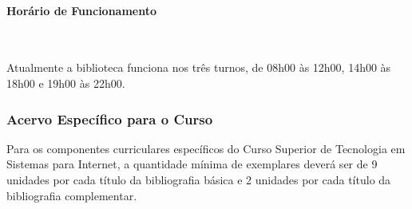 \paragraph{Horário de Funcionamento}\

Atualmente a biblioteca funciona nos três turnos, de 08h00 às 12h00, 14h00 às 18h00 e 19h00 às 22h00.


\subsubsection{Acervo Específico para o Curso}

Para os componentes curriculares específicos do Curso Superior de Tecnologia em Sistemas para Internet, a quantidade mínima de exemplares deverá ser de 9 unidades por cada título da bibliografia básica e 2 unidades por cada título da bibliografia complementar.

